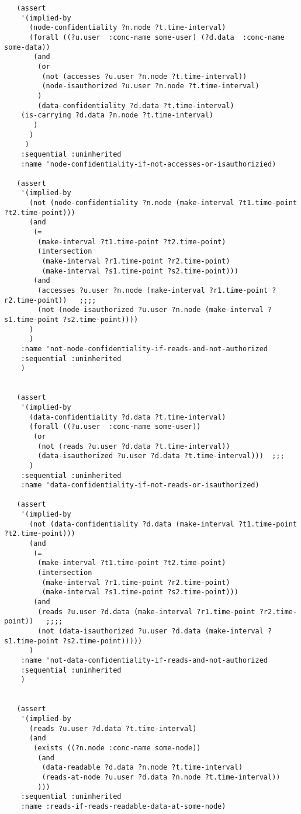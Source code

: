 \begin{lstlisting}
   (assert
    '(implied-by
      (node-confidentiality ?n.node ?t.time-interval)
      (forall ((?u.user  :conc-name some-user) (?d.data  :conc-name some-data))
       (and
        (or
         (not (accesses ?u.user ?n.node ?t.time-interval))
         (node-isauthorized ?u.user ?n.node ?t.time-interval)
        )
        (data-confidentiality ?d.data ?t.time-interval)
	(is-carrying ?d.data ?n.node ?t.time-interval)
       ) 
      )
     )
    :sequential :uninherited
    :name 'node-confidentiality-if-not-accesses-or-isauthorizied)

   (assert
    '(implied-by
      (not (node-confidentiality ?n.node (make-interval ?t1.time-point ?t2.time-point)))
      (and
       (=
        (make-interval ?t1.time-point ?t2.time-point)
        (intersection
         (make-interval ?r1.time-point ?r2.time-point)
         (make-interval ?s1.time-point ?s2.time-point)))
       (and
        (accesses ?u.user ?n.node (make-interval ?r1.time-point ?r2.time-point))   ;;;;
        (not (node-isauthorized ?u.user ?n.node (make-interval ?s1.time-point ?s2.time-point))))
      )
      )
    :name 'not-node-confidentiality-if-reads-and-not-authorized
    :sequential :uninherited
    )
  
    
   (assert
    '(implied-by
      (data-confidentiality ?d.data ?t.time-interval)
      (forall ((?u.user  :conc-name some-user))
       (or
        (not (reads ?u.user ?d.data ?t.time-interval))
        (data-isauthorized ?u.user ?d.data ?t.time-interval)))  ;;;
      )
    :sequential :uninherited
    :name 'data-confidentiality-if-not-reads-or-isauthorized)

   (assert
    '(implied-by
      (not (data-confidentiality ?d.data (make-interval ?t1.time-point ?t2.time-point)))
      (and
       (=
        (make-interval ?t1.time-point ?t2.time-point)
        (intersection
         (make-interval ?r1.time-point ?r2.time-point)
         (make-interval ?s1.time-point ?s2.time-point)))
       (and
        (reads ?u.user ?d.data (make-interval ?r1.time-point ?r2.time-point))   ;;;;
        (not (data-isauthorized ?u.user ?d.data (make-interval ?s1.time-point ?s2.time-point)))))
      )
    :name 'not-data-confidentiality-if-reads-and-not-authorized
    :sequential :uninherited
    )
  

   (assert
    '(implied-by
      (reads ?u.user ?d.data ?t.time-interval)
      (and
       (exists ((?n.node :conc-name some-node))
        (and
         (data-readable ?d.data ?n.node ?t.time-interval)
         (reads-at-node ?u.user ?d.data ?n.node ?t.time-interval))
        )))
    :sequential :uninherited
    :name :reads-if-reads-readable-data-at-some-node)


\end{lstlisting}
